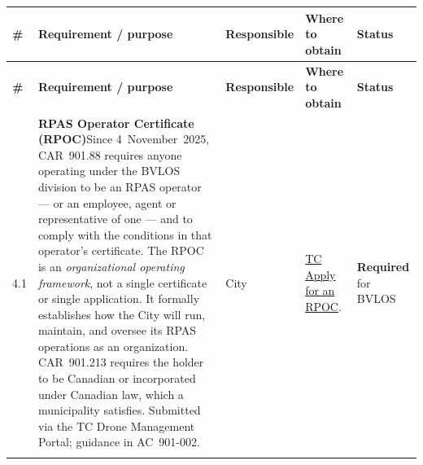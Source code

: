 \documentclass[11pt,letterpaper]{article}
\newcommand{\itemrule}{\arrayrulecolor{uavrule}\midrule\arrayrulecolor{black}}
\newcommand{\reqcell}[2]{\textbf{#1}\newline\small\color{uavgrey}#2}
\newcommand{\req}{\textbf{\color{uavwarn!85!black}Required}}
\newcommand{\checklisthead}{%
  \toprule
  \color{uavblue}\bfseries\# &
  \color{uavblue}\bfseries Requirement / purpose &
  \color{uavblue}\bfseries Responsible &
  \color{uavblue}\bfseries Where to obtain &
  \color{uavblue}\bfseries Status \\
  \midrule
}
\begin{document}
\begin{longtable}{@{}L{0.28in} L{2.20in} L{0.85in} L{1.95in} L{0.85in}@{}}
\checklisthead
\endfirsthead \checklisthead \endhead

4.1 &
\reqcell{RPAS Operator Certificate (RPOC)}{Since 4~November~2025, CAR~901.88 requires anyone operating under the BVLOS division to be an RPAS operator --- or an employee, agent or representative of one --- and to comply with the conditions in that operator's certificate. The RPOC is an \emph{organizational operating framework}, not a single certificate or single application. It formally establishes how the City will run, maintain, and oversee its RPAS operations as an organization. CAR~901.213 requires the holder to be Canadian or incorporated under Canadian law, which a municipality satisfies. Submitted via the TC Drone Management Portal; guidance in AC~901-002.} &
City &
\href{https://tc.canada.ca/en/aviation/drone-safety/drone-pilot-licensing/apply-rpas-operator-certificate-rpoc}{TC Apply for an RPOC}. &
\req{} for BVLOS \\ \itemrule


\end{longtable}
\end{document}
